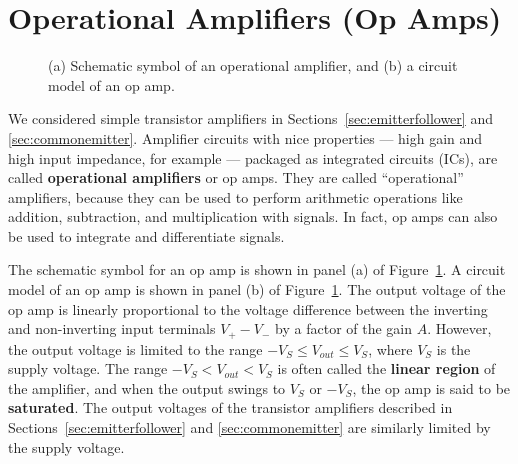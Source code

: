 \documentclass[11pt]{article}
\begin{document}
\newpage

\section{Operational Amplifiers (Op Amps)}
\label{sec:opamps}

\begin{figure}[ht]
  \begin{center}
    \caption{(a) Schematic symbol of an operational amplifier, and (b)
      a circuit model of an op amp.}
    \label{fig:opampmodel}
  \end{center}
\end{figure}

We considered simple transistor amplifiers in
Sections~\ref{sec:emitterfollower} and \ref{sec:commonemitter}.
Amplifier circuits with nice properties --- high gain and high input
impedance, for example --- packaged as integrated circuits (ICs), are
called \textbf{operational amplifiers} or op amps. They are called
``operational'' amplifiers, because they can be used to perform
arithmetic operations like addition, subtraction, and multiplication
with signals. In fact, op amps can also be used to integrate and
differentiate signals.

The schematic symbol for an op amp is shown in panel (a) of
Figure~\ref{fig:opampmodel}. A circuit model of an op amp is shown in
panel (b) of Figure~\ref{fig:opampmodel}. The output voltage of the op
amp is linearly proportional to the voltage difference between the
inverting and non-inverting input terminals $V_+ - V_-$ by a factor of
the gain $A$. However, the output voltage is limited to the range
$-V_S \leq V_{out} \leq V_S$, where $V_S$ is the supply voltage. The
range $-V_S < V_{out} < V_S$ is often called the \textbf{linear
  region} of the amplifier, and when the output swings to $V_S$ or
$-V_S$, the op amp is said to be \textbf{saturated}. The output
voltages of the transistor amplifiers described in
Sections~\ref{sec:emitterfollower} and \ref{sec:commonemitter} are
similarly limited by the supply voltage.
\end{document}
